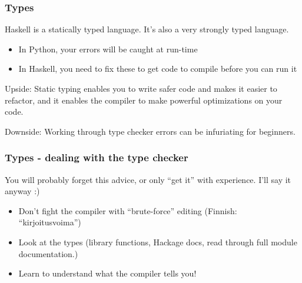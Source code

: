 \documentclass{beamer}
\begin{document}
\begin{frame}[fragile]
\frametitle{Types}

Haskell is a statically typed language.  It's also a very strongly
typed language.
\bigskip

\begin{itemize}
\item In Python, your errors will be caught at run-time
\item In Haskell, you need to fix these to get code to compile before
  you can run it
\end{itemize}

\bigskip
Upside: Static typing enables you to write safer code and makes it
easier to refactor, and it enables the compiler to make powerful
optimizations on your code.

\bigskip
Downside: Working through type checker errors can be infuriating for
beginners.

\end{frame}


\begin{frame}[fragile]
\frametitle{Types - dealing with the type checker}

You will probably forget this advice, or only ``get it'' with
experience.  I'll say it anyway :)

\begin{itemize}
\item Don't fight the compiler with ``brute-force'' editing (Finnish:
  ``kirjoitusvoima'')
\item Look at the types (library functions, Hackage docs, read through
  full module documentation.)
\item Learn to understand what the compiler tells you!
\end{itemize}
\end{frame}
\end{document}
